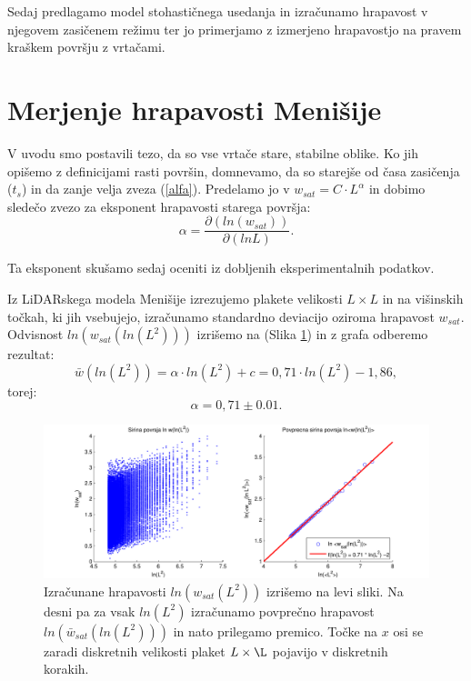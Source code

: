 \documentclass[a4paper, twoside, 12pt]{book}
\begin{document}
Sedaj predlagamo model stohastičnega usedanja in izračunamo hrapavost v njegovem zasičenem režimu ter jo primerjamo z izmerjeno hrapavostjo na pravem kraškem površju z vrtačami.

\section{Merjenje hrapavosti Menišije}
\label{hrapavost}

V uvodu smo postavili tezo, da so vse vrtače stare, stabilne oblike. Ko jih opišemo z definicijami rasti površin, domnevamo, da so starejše od časa zasičenja ($t_s$) in da zanje velja zveza (\ref{alfa}). Predelamo jo v $ w_{sat}=C \cdot L^\alpha $ in dobimo sledečo zvezo za eksponent hrapavosti starega površja:
    \begin{equation}
      \alpha = \frac{\partial ( ln (w_{sat}) ) }{\partial ( ln L )}.
      \label{alpha-numeric}
    \end{equation}

Ta eksponent skušamo sedaj oceniti iz dobljenih eksperimentalnih podatkov.

Iz LiDARskega modela Menišije izrezujemo plakete velikosti $L\times L$ in na višinskih točkah, ki jih vsebujejo, izračunamo standardno deviacijo oziroma hrapavost ${w}_{sat}$. Odvisnost $ln(w_{sat}(ln(L^2)))$ izrišemo na (Slika \ref{fig:menisija-alfa}) in z grafa odberemo rezultat:
\begin{equation}
  \bar w(ln(L^2)) = \alpha \cdot ln(L^2) + c = 0,71 \cdot  ln(L^2) - 1,86,
\end{equation}
torej:
\begin{equation}
  \alpha =  0,71 \pm 0.01.
\end{equation}
\begin{figure}[h!]
  \begin{center}
    \includegraphics[width=14.5cm]{slike/menisija-alfa-3d.pdf}
  \end{center}
  \caption{Izračunane hrapavosti $ln({w}_{sat}(L^2))$ izrišemo na levi sliki. Na desni pa za vsak $ln(L^2)$ izračunamo povprečno hrapavost $ln(\bar w_{sat}(ln(L^2)))$ in nato prilegamo premico. Točke na $x$ osi se zaradi diskretnih velikosti plaket $L\times\L$ pojavijo v diskretnih korakih.}
  \label{fig:menisija-alfa}
\end{figure}
\end{document}
